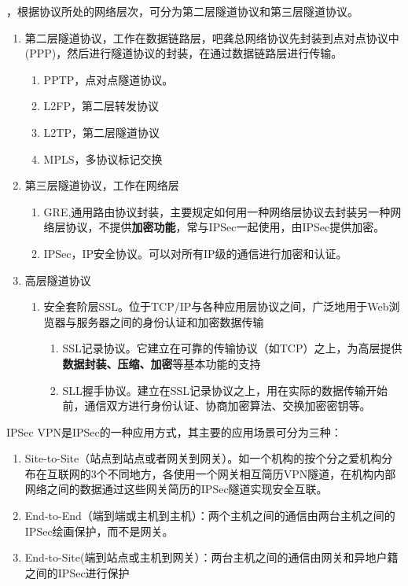 ，根据协议所处的网络层次，可分为第二层隧道协议和第三层隧道协议。
\begin{enumerate}
	\item 第二层隧道协议，工作在数据链路层，吧龚总网络协议先封装到点对点协议中(PPP)，然后进行隧道协议的封装，在通过数据链路层进行传输。
	\begin{enumerate}
		\item PPTP，点对点隧道协议。
		\item L2FP，第二层转发协议
		\item L2TP，第二层隧道协议
		\item MPLS，多协议标记交换
	\end{enumerate}
	\item 第三层隧道协议，工作在网络层
	\begin{enumerate}
		\item GRE,通用路由协议封装，主要规定如何用一种网络层协议去封装另一种网络层协议，不提供\textbf{加密功能}，常与IPSec一起使用，由IPSec提供加密。
		\item IPSec，IP安全协议。可以对所有IP级的通信进行加密和认证。\
	\end{enumerate}
	\item 高层隧道协议
	\begin{enumerate}
		\item 安全套阶层SSL。位于TCP/IP与各种应用层协议之间，广泛地用于Web浏览器与服务器之间的身份认证和加密数据传输
		\begin{enumerate}
			\item SSL记录协议。它建立在可靠的传输协议（如TCP）之上，为高层提供\textbf{数据封装、压缩、加密}等基本功能的支持
			\item SLL握手协议。建立在SSL记录协议之上，用在实际的数据传输开始前，通信双方进行身份认证、协商加密算法、交换加密密钥等。
		\end{enumerate}
	\end{enumerate}
\end{enumerate}

IPSec VPN是IPSec的一种应用方式，其主要的应用场景可分为三种：
\begin{enumerate}
\item Site-to-Site（站点到站点或者网关到网关）。如一个机构的按个分之爱机构分布在互联网的3个不同地方，各使用一个网关相互简历VPN隧道，在机构内部网络之间的数据通过这些网关简历的IPSec隧道实现安全互联。
\item End-to-End（端到端或主机到主机）：两个主机之间的通信由两台主机之间的IPSec绘画保护，而不是网关。
\item End-to-Site(端到站点或主机到网关）：两台主机之间的通信由网关和异地户籍之间的IPSec进行保护
\end{enumerate}

